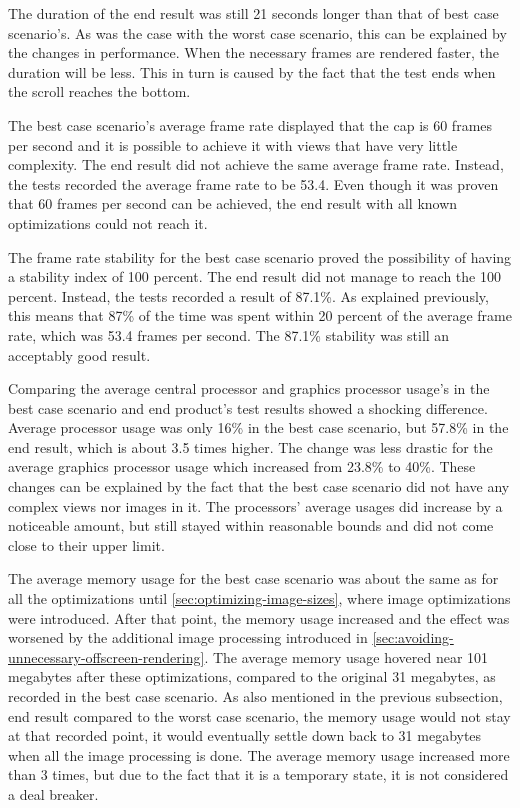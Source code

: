 \documentclass[a4paper,12pt]{article}
\begin{document}
The duration of the end result was still 21 seconds longer than that of best case scenario's. As was the case with the worst case scenario, this can be explained by the changes in performance. When the necessary frames are rendered faster, the duration will be less. This in turn is caused by the fact that the test ends when the scroll reaches the bottom.

The best case scenario's average frame rate displayed that the cap is 60 frames per second and it is possible to achieve it with views that have very little complexity. The end result did not achieve the same average frame rate. Instead, the tests recorded the average frame rate to be 53.4. Even though it was proven that 60 frames per second can be achieved, the end result with all known optimizations could not reach it.

The frame rate stability for the best case scenario proved the possibility of having a stability index of 100 percent. The end result did not manage to reach the 100 percent. Instead, the tests recorded a result of 87.1\%. As explained previously, this means that 87\% of the time was spent within 20 percent of the average frame rate, which was 53.4 frames per second. The 87.1\% stability was still an acceptably good result.

Comparing the average central processor and graphics processor usage's in the best case scenario and end product's test results showed a shocking difference. Average processor usage was only 16\% in the best case scenario, but 57.8\% in the end result, which is about 3.5 times higher. The change was less drastic for the average graphics processor usage which increased from 23.8\% to 40\%. These changes can be explained by the fact that the best case scenario did not have any complex views nor images in it. The processors' average usages did increase by a noticeable amount, but still stayed within reasonable bounds and did not come close to their upper limit.

The average memory usage for the best case scenario was about the same as for all the optimizations until \autoref{sec:optimizing-image-sizes}, where image optimizations were introduced. After that point, the memory usage increased and the effect was worsened by the additional image processing introduced in \autoref{sec:avoiding-unnecessary-offscreen-rendering}. The average memory usage hovered near 101 megabytes after these optimizations, compared to the original 31 megabytes, as recorded in the best case scenario. As also mentioned in the previous subsection, end result compared to the worst case scenario, the memory usage would not stay at that recorded point, it would eventually settle down back to 31 megabytes when all the image processing is done. The average memory usage increased more than 3 times, but due to the fact that it is a temporary state, it is not considered a deal breaker.
\end{document}
